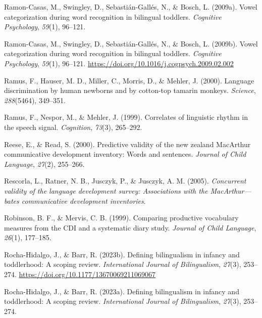 \documentclass[
  12pt,
  b5paperpaper,
  twoside]{scrreprt}
\newlength{\cslhangindent}
\newlength{\cslentryspacingunit} %
\newenvironment{CSLReferences}[2] %
 {%
  \setlength{\parindent}{0pt}
  \ifodd #1
  \let\oldpar\par
  \def\par{\hangindent=\cslhangindent\oldpar}
  \fi
  \setlength{\parskip}{#2\cslentryspacingunit}
 }%
 {}
\begin{document}
\begin{CSLReferences}{1}{0}
\leavevmode{}%
Ramon-Casas, M., Swingley, D., Sebastián-Gallés, N., \& Bosch, L.
(2009a). Vowel categorization during word recognition in bilingual
toddlers. \emph{Cognitive Psychology}, \emph{59}(1), 96--121.

\leavevmode{}%
Ramon-Casas, M., Swingley, D., Sebastián-Gallés, N., \& Bosch, L.
(2009b). Vowel categorization during word recognition in bilingual
toddlers. \emph{Cognitive Psychology}, \emph{59}(1), 96--121.
\url{https://doi.org/10.1016/j.cogpsych.2009.02.002}

\leavevmode{}%
Ramus, F., Hauser, M. D., Miller, C., Morris, D., \& Mehler, J. (2000).
Language discrimination by human newborns and by cotton-top tamarin
monkeys. \emph{Science}, \emph{288}(5464), 349--351.

\leavevmode{}%
Ramus, F., Nespor, M., \& Mehler, J. (1999). Correlates of linguistic
rhythm in the speech signal. \emph{Cognition}, \emph{73}(3), 265--292.

\leavevmode{}%
Reese, E., \& Read, S. (2000). Predictive validity of the new zealand
MacArthur communicative development inventory: Words and sentences.
\emph{Journal of Child Language}, \emph{27}(2), 255--266.

\leavevmode{}%
Rescorla, L., Ratner, N. B., Jusczyk, P., \& Jusczyk, A. M. (2005).
\emph{Concurrent validity of the language development survey:
Associations with the MacArthur---bates communicative development
inventories}.

\leavevmode{}%
Robinson, B. F., \& Mervis, C. B. (1999). Comparing productive
vocabulary measures from the CDI and a systematic diary study.
\emph{Journal of Child Language}, \emph{26}(1), 177--185.

\leavevmode{}%
Rocha-Hidalgo, J., \& Barr, R. (2023b). Defining bilingualism in infancy
and toddlerhood: A scoping review. \emph{International Journal of
Bilingualism}, \emph{27}(3), 253--274.
\url{https://doi.org/10.1177/13670069211069067}

\leavevmode{}%
Rocha-Hidalgo, J., \& Barr, R. (2023a). Defining bilingualism in infancy
and toddlerhood: A scoping review. \emph{International Journal of
Bilingualism}, \emph{27}(3), 253--274.


\end{CSLReferences}
\end{document}
